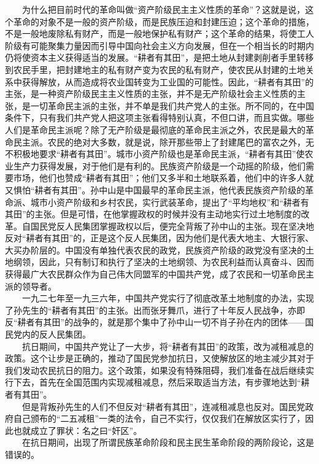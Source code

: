 \documentclass[cn,11pt,chinese]{elegantbook}
\begin{document}
　　为什么把目前时代的革命叫做“资产阶级民主主义性质的革命”？这就是说，这个革命的对象不是一般的资产阶级，而是民族压迫和封建压迫；这个革命的措施，不是一般地废除私有财产，而是一般地保护私有财产；这个革命的结果，将使工人阶级有可能聚集力量因而引导中国向社会主义方向发展，但在一个相当长的时期内仍将使资本主义获得适当的发展。“耕者有其田”，是把土地从封建剥削者手里转移到农民手里，把封建地主的私有财产变为农民的私有财产，使农民从封建的土地关系中获得解放，从而造成将农业国转变为工业国的可能性。因此，“耕者有其田”的主张，是一种资产阶级民主主义性质的主张，并不是无产阶级社会主义性质的主张，是一切革命民主派的主张，并不单是我们共产党人的主张。所不同的，在中国条件下，只有我们共产党人把这项主张看得特别认真，不但口讲，而且实做。哪些人们是革命民主派呢？除了无产阶级是最彻底的革命民主派之外，农民是最大的革命民主派。农民的绝对大多数，就是说，除开那些带上了封建尾巴的富农之外，无不积极地要求“耕者有其田”。城市小资产阶级也是革命民主派，“耕者有其田”使农业生产力获得发展，对于他们是有利的。民族资产阶级是一个动摇的阶级，他们需要市场，他们也赞成“耕者有其田”；他们又多半和土地联系着，他们中的许多人就又惧怕“耕者有其田”。孙中山是中国最早的革命民主派，他代表民族资产阶级的革命派、城市小资产阶级和乡村农民，实行武装革命，提出了“平均地权”和“耕者有其田”的主张。但是可惜，在他掌握政权的时候并没有主动地实行过土地制度的改革。自国民党反人民集团掌握政权以后，便完全背叛了孙中山的主张。现在坚决地反对“耕者有其田”的，正是这个反人民集团，因为他们是代表大地主、大银行家、大买办阶层的。中国没有单独代表农民的政党，民族资产阶级的政党没有坚决的土地纲领，因此，只有制订和执行了坚决的土地纲领、为农民利益而认真奋斗、因而获得最广大农民群众作为自己伟大同盟军的中国共产党，成了农民和一切革命民主派的领导者。\\
　　一九二七年至一九三六年，中国共产党实行了彻底改革土地制度的办法，实现了孙先生的“耕者有其田”的主张。出而张牙舞爪，进行了十年反人民战争，亦即反“耕者有其田”的战争的，就是那个集中了孙中山一切不肖子孙在内的团体——国民党内的反人民集团。\\
　　抗日期间，中国共产党让了一大步，将“耕者有其田”的政策，改为减租减息的政策。这个让步是正确的，推动了国民党参加抗日，又使解放区的地主减少其对于我们发动农民抗日的阻力。这个政策，如果没有特殊阻碍，我们准备在战后继续实行下去，首先在全国范围内实现减租减息，然后采取适当方法，有步骤地达到“耕者有其田”。\\
　　但是背叛孙先生的人们不但反对“耕者有其田”，连减租减息也反对。国民党政府自己颁布的“二五减租”一类的法令，自己不实行，仅仅我们在解放区实行了，因此也就成立了罪状：名之曰“奸区”。\\
　　在抗日期间，出现了所谓民族革命阶段和民主民生革命阶段的两阶段论，这是错误的。\\
\end{document}
